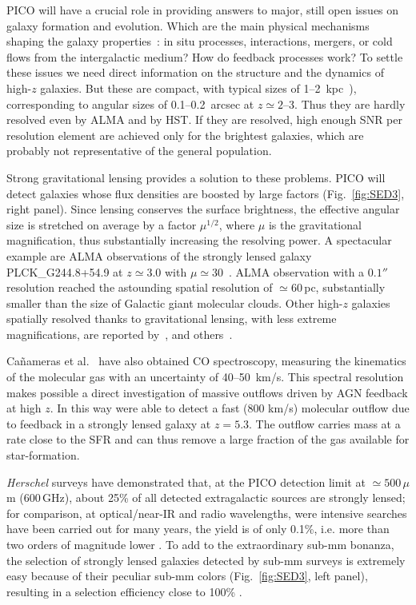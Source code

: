 \documentclass[PICOReport.tex]{subfiles}
\begin{document}
PICO will have a crucial role in providing answers to major, still open issues on galaxy formation and evolution. Which are the main physical mechanisms shaping the galaxy properties~\citep{SilkMamon2012, SomervilleDave2015}: in situ processes, interactions, mergers, or cold flows  from the intergalactic medium? How do feedback processes work? To settle these issues we need direct information on the structure and the dynamics of high-$z$ galaxies. But these are compact, with typical sizes of 1--2~kpc~\cite{Fujimoto2018}), corresponding to angular sizes of 0.1--0.2~arcsec at $z\simeq 2$--3. Thus they are hardly resolved even by ALMA and by HST. If they are resolved, high enough \ac{SNR} per resolution element are achieved only for the brightest galaxies, which are probably not representative of the general population.

Strong gravitational lensing provides a solution to these problems. PICO will detect galaxies whose flux densities are boosted by large factors (Fig.~\ref{fig:SED3}, right panel). Since lensing conserves the surface brightness, the effective angular size is stretched on average by a factor $\mu^{1/2}$, where $\mu$ is the gravitational magnification, thus substantially increasing the resolving power. A spectacular example are ALMA observations of the strongly lensed galaxy PLCK\_G244.8\-+54.9 at $z \simeq 3.0$  with $\mu \simeq 30$~\citep{Canameras2017ALMA}. ALMA observation with a $0.1''$ resolution reached the astounding spatial resolution of $\simeq 60\,$pc, substantially smaller than the size of Galactic giant molecular clouds. Other high-$z$ galaxies spatially resolved thanks to gravitational lensing, with less extreme magnifications, are reported by~\citet{Dye2018}, and others~\citep{Lamarche2018, Sharda2018}.

Ca\~{n}ameras et al.~\citep{Canameras2017ALMA} have also obtained CO spectroscopy, measuring the kinematics of the molecular gas with an uncertainty of 40--50~km/s. This spectral resolution makes possible a direct investigation of massive outflows driven by AGN feedback at high $z$. In this way \citet{Spilker2018} were able to detect a fast (800 km/s) molecular outflow due to feedback in a strongly lensed galaxy at $z=5.3$. The outflow carries mass at a rate close to the SFR and can thus remove a large fraction of the gas available for star-formation.

\textit{Herschel} surveys have demonstrated that, at the PICO detection limit at $\simeq 500\,\mu$m (600\,GHz), about 25\% of all detected extragalactic sources are strongly lensed; for comparison, at optical/near-IR and radio wavelengths, were intensive searches have been carried out for many years, the yield is of only 0.1\%, i.e. more than two orders of magnitude lower \cite{Treu2010}. To add to the extraordinary sub-mm bonanza, the selection of strongly lensed galaxies detected by sub-mm surveys is extremely easy because of their peculiar sub-mm colors (Fig.~\ref{fig:SED3}, left panel), resulting in a selection efficiency close to 100\% \citep{Negrello2010}.
\end{document}
